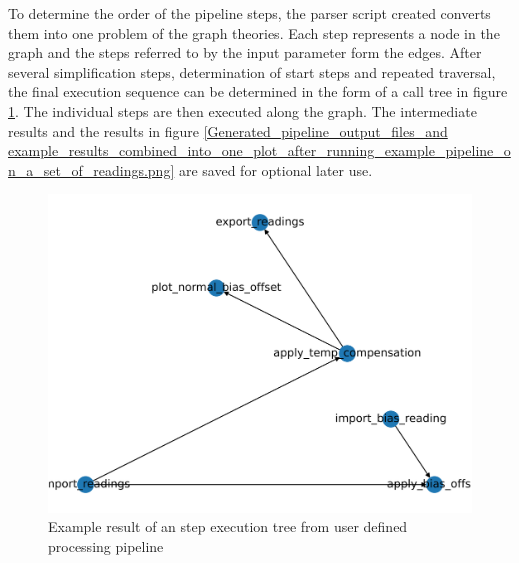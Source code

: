 To determine the order of the pipeline steps, the parser script created
converts them into one problem of the graph theories. Each step
represents a node in the graph and the steps referred to by the input
parameter form the edges. After several simplification steps,
determination of start steps and repeated traversal, the final execution
sequence can be determined in the form of a call tree in figure
\ref{Example_result_of_an_step_execution_tree_from_user_defined_processing_pipeline.png}.
The individual steps are then executed along the graph. The intermediate
results and the results in figure
\ref{Generated_pipeline_output_files_and example_results_combined_into_one_plot_after_running_example_pipeline_on_a_set_of_readings.png}
are saved for optional later use.

\begin{figure}
\centering
\includegraphics{./generated_images/border_Example_result_of_an_step_execution_tree_from_user_defined_processing_pipeline.png}
\caption{Example result of an step execution tree from user defined
processing pipeline
\label{Example_result_of_an_step_execution_tree_from_user_defined_processing_pipeline.png}}
\end{figure}

